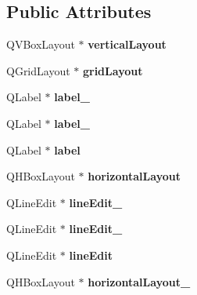\subsection*{Public Attributes}
\begin{DoxyCompactItemize}
\item 
\hypertarget{classUi__NewDB_a9dff76495d9c01ca0adb6d4ae5647fbc}{Q\-V\-Box\-Layout $\ast$ {\bfseries vertical\-Layout}}\label{classUi__NewDB_a9dff76495d9c01ca0adb6d4ae5647fbc}

\item 
\hypertarget{classUi__NewDB_a754bb2ccd4cd7381d195e608e1a03e3d}{Q\-Grid\-Layout $\ast$ {\bfseries grid\-Layout}}\label{classUi__NewDB_a754bb2ccd4cd7381d195e608e1a03e3d}

\item 
\hypertarget{classUi__NewDB_ab5a707520470bc1b0506b2592991cf41}{Q\-Label $\ast$ {\bfseries label\-\_}}\label{classUi__NewDB_ab5a707520470bc1b0506b2592991cf41}

\item 
\hypertarget{classUi__NewDB_a018bc89bfd201f79d0b6f83376b8d1dd}{Q\-Label $\ast$ {\bfseries label\-\_}}\label{classUi__NewDB_a018bc89bfd201f79d0b6f83376b8d1dd}

\item 
\hypertarget{classUi__NewDB_a0b7cbad149393be2d42a55f35aa6a41d}{Q\-Label $\ast$ {\bfseries label}}\label{classUi__NewDB_a0b7cbad149393be2d42a55f35aa6a41d}

\item 
\hypertarget{classUi__NewDB_a22d07c33cac979fc1027a879682a77ca}{Q\-H\-Box\-Layout $\ast$ {\bfseries horizontal\-Layout}}\label{classUi__NewDB_a22d07c33cac979fc1027a879682a77ca}

\item 
\hypertarget{classUi__NewDB_a5b50844721eb57715bce1132baa71e38}{Q\-Line\-Edit $\ast$ {\bfseries line\-Edit\-\_}}\label{classUi__NewDB_a5b50844721eb57715bce1132baa71e38}

\item 
\hypertarget{classUi__NewDB_a8a56adbfd095638426e4975443fee2db}{Q\-Line\-Edit $\ast$ {\bfseries line\-Edit\-\_}}\label{classUi__NewDB_a8a56adbfd095638426e4975443fee2db}

\item 
\hypertarget{classUi__NewDB_a33e0b50acfaed1a733c62c2cd5f92b72}{Q\-Line\-Edit $\ast$ {\bfseries line\-Edit}}\label{classUi__NewDB_a33e0b50acfaed1a733c62c2cd5f92b72}

\item 
\hypertarget{classUi__NewDB_a40da91647c833ca87bbe290d7b615af4}{Q\-H\-Box\-Layout $\ast$ {\bfseries horizontal\-Layout\-\_}}\label{classUi__NewDB_a40da91647c833ca87bbe290d7b615af4}


\end{DoxyCompactItemize}
